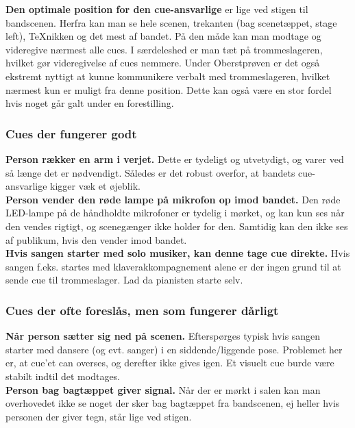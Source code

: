 \textbf{Den optimale position for den cue-ansvarlige} er lige ved stigen til bandscenen. Herfra kan man se hele scenen, trekanten (bag scenetæppet, stage left), TeXnikken og det mest af bandet. På den måde kan man modtage og videregive nærmest alle cues. I særdeleshed er man tæt på trommeslageren, hvilket gør videregivelse af cues nemmere. Under Oberstprøven er det også ekstremt nyttigt at kunne kommunikere verbalt med trommeslageren, hvilket nærmest kun er muligt fra denne position. Dette kan også være en stor fordel hvis noget går galt under en forestilling.

\subsubsection{Cues der fungerer godt}
\textbf{Person rækker en arm i verjet.}
Dette er tydeligt og utvetydigt, og varer ved så længe det er nødvendigt. Således er det robust overfor, at bandets cue-ansvarlige kigger væk et øjeblik.\\
\textbf{Person vender den røde lampe på mikrofon op imod bandet.}
Den røde LED-lampe på de håndholdte mikrofoner er tydelig i mørket, og kan kun ses når den vendes rigtigt, og scenegænger ikke holder for den. Samtidig kan den ikke ses af publikum, hvis den vender imod bandet.\\
\textbf{Hvis sangen starter med solo musiker, kan denne tage cue direkte.} Hvis sangen f.eks. startes med klaverakkompagnement alene er der ingen grund til at sende cue til trommeslager.
Lad da pianisten starte selv.

\subsubsection{Cues der ofte foreslås, men som fungerer dårligt}
\textbf{Når person sætter sig ned på scenen.}
Efterspørges typisk hvis sangen starter med dansere (og evt. sanger) i en siddende/liggende pose.
Problemet her er, at cue'et can overses, og derefter ikke gives igen. Et visuelt cue burde være stabilt indtil det modtages.\\
\textbf{Person bag bagtæppet giver signal.}
Når der er mørkt i salen kan man overhovedet ikke se noget der sker bag bagtæppet fra bandscenen, ej heller hvis personen der giver tegn, står lige ved stigen.

